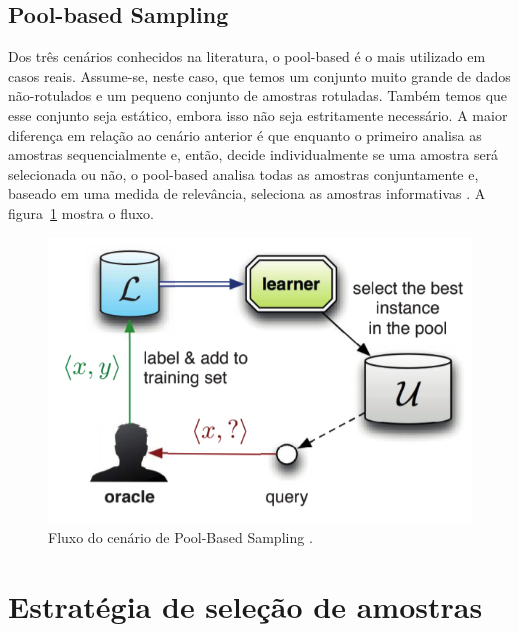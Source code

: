 \subsection{Pool-based Sampling}
\label{sec:cenarios_pool}

Dos três cenários conhecidos na literatura, o pool-based é o mais utilizado em casos reais.
Assume-se, neste caso, que temos um conjunto muito grande de dados não-rotulados e um pequeno conjunto de amostras rotuladas. Também temos que esse conjunto seja estático, embora isso não seja estritamente necessário. A maior diferença em relação ao cenário anterior é que enquanto o primeiro analisa as amostras sequencialmente e, então, decide individualmente se uma amostra será selecionada ou não, o pool-based analisa todas as amostras conjuntamente e, baseado em uma medida de relevância, seleciona as amostras informativas \citep{settles2014active}. A figura~\ref{fig:settles_2014_pool} mostra o fluxo.

\begin{figure}
  \centering
  \includegraphics[width=.5\textwidth]{figures/settles_2014_pool.png}
  \caption{Fluxo do cenário de Pool-Based Sampling \citep{settles2014active}.}
  \label{fig:settles_2014_pool}
\end{figure}




\section{Estratégia de seleção de amostras}
\label{sec:query_strategy}

